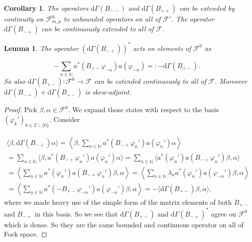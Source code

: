 \documentclass[b5paper,draft,openbib,12pt]{memoir}
\newtheorem{Lemma}[Def]{Lemma}
\newtheorem{Corollary}[Def]{Corollary}
\begin{document}
\begin{Corollary}
The operators \(\mathrm{d}\Gamma(B_{--})\) and \(\mathrm{d}\Gamma(B_{++})\) can be extended by continuity on \(\mathcal{F}^0_{m,p}\) to unbounded operators on all of \(\mathcal{F}'\).
The operator \(\mathrm{d}\Gamma(B_{-+})\) can be continuously extended to all of \(\mathcal{F}\).
\end{Corollary}

\begin{Lemma}
The operator \(\left(\mathrm{d}\Gamma(B_{-+})\right)^*\)  acts on elements of \(\mathcal{F}^0\) as

\begin{equation}
- \sum_{n\in\mathbb{N}} a^*(B_{+-}\varphi_{-n}) a(\varphi_{-n})=:-\mathrm{d}\Gamma(B_{+-}).
\end{equation}
So also \(\mathrm{d}\Gamma(B_{+-}):\mathcal{F}^0\rightarrow \mathcal{F}\) can be extended continuously to all of \(\mathcal{F}\).
Moreover \(\mathrm{d}\Gamma(B_{-+})+\mathrm{d}\Gamma(B_{+-})\) is skew-adjoint.
\end{Lemma}
\begin{proof}
Pick \(\beta,\alpha \in \mathcal{F}^0\). We expand those states with respect to the basis \((\varphi_k')_{k\in\mathbb{Z}\backslash \{0\}}\). Consider

\begin{align}\nonumber
\langle \beta, \mathrm{d}\Gamma(B_{-+}) \alpha \rangle=\left\langle \beta, \sum_{n\in\mathbb{N}} a^*(B_{-+}\varphi_n')a(\varphi_{n}') \alpha \right\rangle\\\nonumber
=\sum_{n\in\mathbb{N}} \langle \beta , a^*(B_{-+}\varphi_n')a(\varphi_{n}') \alpha\rangle
=\sum_{n\in\mathbb{N}}  \langle a^*(\varphi_{n}')  a(B_{-+}\varphi_n')\beta , \alpha\rangle\\\nonumber
=\left\langle \sum_{n\in\mathbb{N}}a^*(\varphi_{n}')  a(B_{-+}\varphi_n') \beta, \alpha \right\rangle
=\left\langle \sum_{n\in\mathbb{N}} \lambda_n a^*(\varphi_{n}')  a(\varphi_{-n}') \beta, \alpha \right\rangle\\
=\left\langle \sum_{n\in\mathbb{N}}  a^*(- B_{+-}\varphi_{-n}')  a(\varphi_{-n}') \beta, \alpha \right\rangle
=-\langle \mathrm{d}\Gamma(B_{+-})  \beta, \alpha \rangle,
\end{align}
where we made heavy use of the simple form of the matrix elements of both \(B_{+-}\) and \(B_{-+}\) in this basis. So we see that \(\mathrm{d}\Gamma(B_{+-})\)
and \(\mathrm{d}\Gamma(B_{-+})^*\) agree on \(\mathcal{F}^0\) which is dense. So they are the same bounded and continuous operator on all of
Fock space. 
\end{proof}
\end{document}
